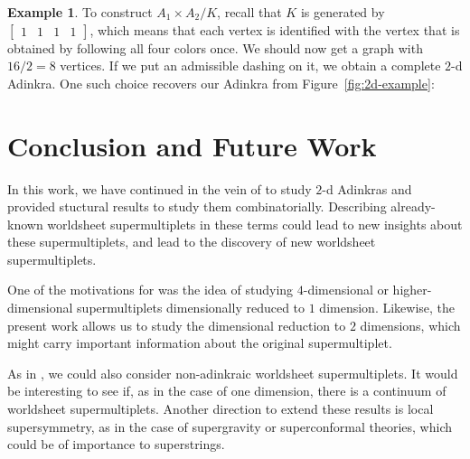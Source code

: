 \documentclass[12pt,twoside,singlespace]{article}
\numberwithin{equation}{section}
\theoremstyle{definition}
\newtheorem{ex}[equation]{Example}
\begin{document}
\begin{ex}
To construct $A_1 \times A_2/K$, recall that $K$ is generated by $\begin{bmatrix} 1 & 1 & 1 & 1\end{bmatrix}$, which means that each vertex is identified with the vertex that is obtained by following all four colors once. We should now get a graph with $16 / 2 = 8$ vertices. If we put an admissible dashing on it, we obtain a complete $2$-d Adinkra. One such choice recovers our Adinkra from Figure~\ref{fig:2d-example}:
\begin{center}
\end{center}
\end{ex}


\section{Conclusion and Future Work}
\label{sec:conclusion}
In this work, we have continued in the vein of \cite{hubsch:weaving} to study $2$-d Adinkras and provided stuctural results to study them combinatorially.  Describing already-known worldsheet supermultiplets in these terms could lead to new insights about these supermultiplets, and lead to the discovery of new worldsheet supermultiplets.

One of the motivations for \cite{d2l:first} was the idea of studying $4$-dimensional or higher-dimensional supermultiplets dimensionally reduced to $1$ dimension.  Likewise, the present work allows us to study the dimensional reduction to $2$ dimensions, which might carry important information about the original supermultiplet.

As in \cite{hubsch:continuum}, we could also consider non-adinkraic worldsheet supermultiplets.  It would be interesting to see if, as in the case of one dimension, there is a continuum of worldsheet supermultiplets.  Another direction to extend these results is local supersymmetry, as in the case of supergravity or superconformal theories, which could be of importance to superstrings.
\end{document}
